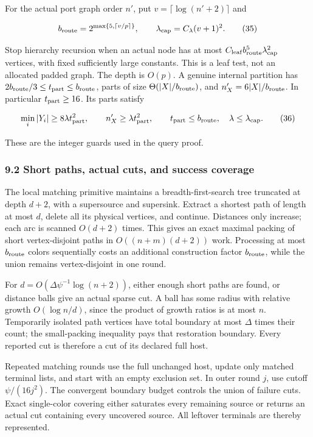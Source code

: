 For the actual port graph order \(n'\), put \(v=\lceil\log(n'+2)\rceil\) and

\[
b_{\rm route}=2^{\max\{5,\lceil v/p\rceil\}},\qquad
 \lambda_{\rm cap}=C_\lambda(v+1)^2.
 \tag{35}
\]

Stop hierarchy recursion when an actual node has at most \(C_{\rm leaf}b_{\rm route}^5\lambda_{\rm cap}^2\) vertices, with fixed sufficiently large constants. This is a leaf test, not an allocated padded graph. The depth is \(O(p)\). A genuine internal partition has \(2b_{\rm route}/3\leq t_{\rm part}\leq b_{\rm route}\), parts of size \(\Theta(|X|/b_{\rm route})\), and \(n'_X=6|X|/b_{\rm route}\). In particular \(t_{\rm part}\geq16\). Its parts satisfy

\[
\min_i|Y_i|\geq8\lambda t_{\rm part}^2,\qquad
 n'_X\geq\lambda t_{\rm part}^2,\qquad
 t_{\rm part}\leq b_{\rm route},\quad \lambda\leq\lambda_{\rm cap}.
 \tag{36}
\]

These are the integer guards used in the query proof.

\hypertarget{af-46593eb93e-short-paths-actual-cuts-and-success-coverage}{%
\subsubsection{9.2 Short paths, actual cuts, and success coverage}\label{af-46593eb93e-short-paths-actual-cuts-and-success-coverage}}

The local matching primitive maintains a breadth-first-search tree truncated at depth \(d+2\), with a supersource and supersink. Extract a shortest path of length at most \(d\), delete all its physical vertices, and continue. Distances only increase; each arc is scanned \(O(d+2)\) times. This gives an exact maximal packing of short vertex-disjoint paths in \(O((n+m)(d+2))\) work. Processing at most \(b_{\rm route}\) colors sequentially costs an additional construction factor \(b_{\rm route}\), while the union remains vertex-disjoint in one round.

For \(d=O(\Delta\psi^{-1}\log(n+2))\), either enough short paths are found, or distance balls give an actual sparse cut. A ball has some radius with relative growth \(O(\log n/d)\), since the product of growth ratios is at most \(n\). Temporarily isolated path vertices have total boundary at most \(\Delta\) times their count; the small-packing inequality pays that restoration boundary. Every reported cut is therefore a cut of its declared full host.

Repeated matching rounds use the full unchanged host, update only matched terminal lists, and start with an empty exclusion set. In outer round \(j\), use cutoff \(\psi/(16j^2)\). The convergent boundary budget controls the union of failure cuts. Exact single-color covering either saturates every remaining source or returns an actual cut containing every uncovered source. All leftover terminals are thereby represented.

